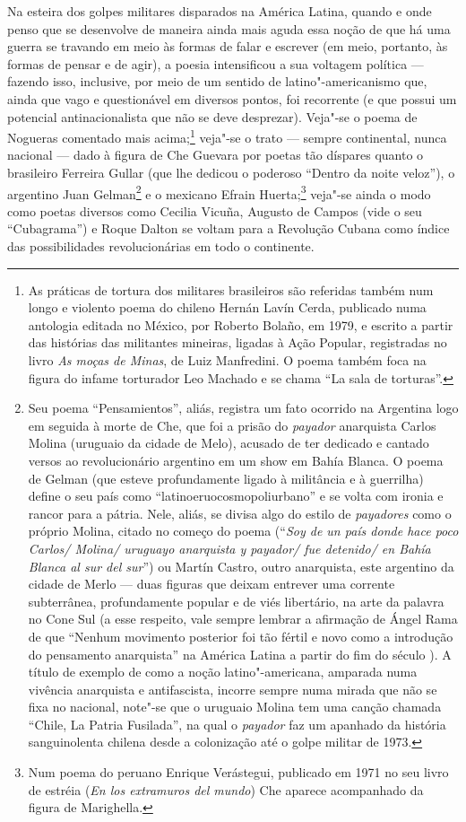 Na esteira dos golpes militares disparados na América Latina, quando e
onde penso que se desenvolve de maneira ainda mais aguda essa noção de
que há uma guerra se travando em meio às formas de falar e escrever (em
meio, portanto, às formas de pensar e de agir), a poesia intensificou a
sua voltagem política --- fazendo isso, inclusive, por meio de um sentido
de latino"-americanismo que, ainda que vago e questionável em diversos
pontos, foi recorrente (e que possui um potencial antinacionalista que
não se deve desprezar). Veja"-se o poema de Nogueras comentado mais
acima;\footnote{As práticas de tortura dos militares brasileiros são
  referidas também num longo e violento poema do chileno Hernán Lavín
  Cerda, publicado numa antologia editada no México, por Roberto Bolaño,
  em 1979, e escrito a partir das histórias das militantes mineiras,
  ligadas à Ação Popular, registradas no livro \emph{As moças de Minas},
  de Luiz Manfredini. O poema também foca na figura do infame torturador
  Leo Machado e se chama ``La sala de torturas''.} veja"-se o trato ---
sempre continental, nunca nacional --- dado à figura de Che Guevara por
poetas tão díspares quanto o brasileiro Ferreira Gullar (que lhe dedicou
o poderoso ``Dentro da noite veloz''), o argentino Juan Gelman\footnote{Seu
  poema ``Pensamientos'', aliás, registra um fato ocorrido na Argentina
  logo em seguida à morte de Che, que foi a prisão do \emph{payador}
  anarquista Carlos Molina (uruguaio da cidade de Melo), acusado de ter
  dedicado e cantado versos ao revolucionário argentino em um show em
  Bahía Blanca. O poema de Gelman (que esteve profundamente ligado à
  militância e à guerrilha) define o seu país como
  ``latinoeruocosmopoliurbano'' e se volta com ironia e rancor para a
  pátria. Nele, aliás, se divisa algo do estilo de \emph{payadores} como
  o próprio Molina, citado no começo do poema (``\emph{Soy de un país
  donde hace poco Carlos/ Molina/ uruguayo anarquista y payador/ fue
  detenido/ en Bahía Blanca al sur del sur}'') ou Martín Castro, outro
  anarquista, este argentino da cidade de Merlo --- duas figuras que
  deixam entrever uma corrente subterrânea, profundamente popular e de
  viés libertário, na arte da palavra no Cone Sul (a esse respeito, vale
  sempre lembrar a afirmação de Ángel Rama de que ``Nenhum movimento
  posterior foi tão fértil e novo como a introdução do pensamento
  anarquista'' na América Latina a partir do fim do século ). A
  título de exemplo de como a noção latino"-americana, amparada numa
  vivência anarquista e antifascista, incorre sempre numa mirada que não
  se fixa no nacional, note"-se que o uruguaio Molina tem uma canção
  chamada ``Chile, La Patria Fusilada'', na qual o \emph{payador} faz um
  apanhado da história sanguinolenta chilena desde a colonização até o
  golpe militar de 1973.} e o mexicano Efrain Huerta;\footnote{Num poema
  do peruano Enrique Verástegui, publicado em 1971 no seu livro de
  estréia (\emph{En los extramuros del mundo}) Che aparece acompanhado
  da figura de Marighella.} veja"-se ainda o modo como poetas diversos
como Cecilia Vicuña, Augusto de Campos (vide o seu ``Cubagrama'') e
Roque Dalton se voltam para a Revolução Cubana como índice das
possibilidades revolucionárias em todo o continente.

